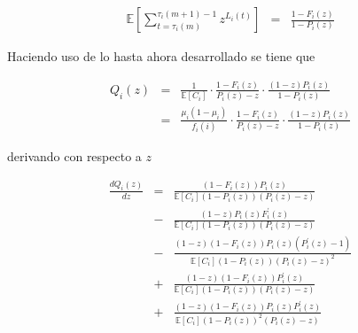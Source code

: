 \documentclass{article}
\newcommand{\esp}{\mathbb{E}}
\begin{document}
\begin{eqnarray*}
\esp\left[\sum_{t=\tau_{i}\left(m\right)}^{\tau_{i}\left(m+1\right)-1}z^{L_{i}\left(t\right)}\right]&=&\frac{1-F_{i}\left(z\right)}{1-P_{i}\left(z\right)}
\end{eqnarray*}

Haciendo uso de lo hasta ahora desarrollado se tiene que

\begin{eqnarray*}
Q_{i}\left(z\right)&=&\frac{1}{\esp\left[C_{i}\right]}\cdot\frac{1-F_{i}\left(z\right)}{P_{i}\left(z\right)-z}\cdot\frac{\left(1-z\right)P_{i}\left(z\right)}{1-P_{i}\left(z\right)}\\
&=&\frac{\mu_{i}\left(1-\mu_{i}\right)}{f_{i}\left(i\right)}\cdot\frac{1-F_{i}\left(z\right)}{P_{i}\left(z\right)-z}\cdot\frac{\left(1-z\right)P_{i}\left(z\right)}{1-P_{i}\left(z\right)}
\end{eqnarray*}

derivando con respecto a $z$



\begin{eqnarray*}
\frac{d Q_{i}\left(z\right)}{d z}&=&\frac{\left(1-F_{i}\left(z\right)\right)P_{i}\left(z\right)}{\esp\left[C_{i}\right]\left(1-P_{i}\left(z\right)\right)\left(P_{i}\left(z\right)-z\right)}\\
&-&\frac{\left(1-z\right)P_{i}\left(z\right)F_{i}^{'}\left(z\right)}{\esp\left[C_{i}\right]\left(1-P_{i}\left(z\right)\right)\left(P_{i}\left(z\right)-z\right)}\\
&-&\frac{\left(1-z\right)\left(1-F_{i}\left(z\right)\right)P_{i}\left(z\right)\left(P_{i}^{'}\left(z\right)-1\right)}{\esp\left[C_{i}\right]\left(1-P_{i}\left(z\right)\right)\left(P_{i}\left(z\right)-z\right)^{2}}\\
&+&\frac{\left(1-z\right)\left(1-F_{i}\left(z\right)\right)P_{i}^{'}\left(z\right)}{\esp\left[C_{i}\right]\left(1-P_{i}\left(z\right)\right)\left(P_{i}\left(z\right)-z\right)}\\
&+&\frac{\left(1-z\right)\left(1-F_{i}\left(z\right)\right)P_{i}\left(z\right)P_{i}^{'}\left(z\right)}{\esp\left[C_{i}\right]\left(1-P_{i}\left(z\right)\right)^{2}\left(P_{i}\left(z\right)-z\right)}
\end{eqnarray*}
\end{document}
